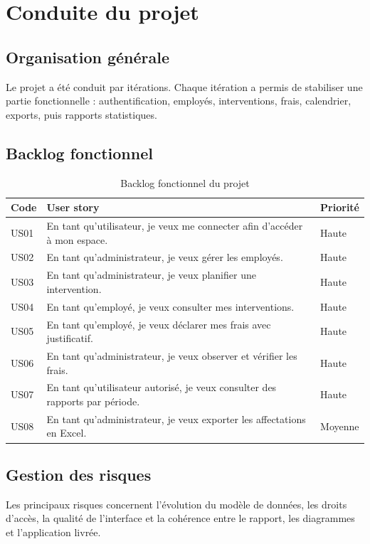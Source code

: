 \documentclass[12pt,a4paper,oneside]{report}
\begin{document}
\chapter{Conduite du projet}
\section{Organisation générale}
Le projet a été conduit par itérations. Chaque itération a permis de stabiliser une partie fonctionnelle : authentification, employés, interventions, frais, calendrier, exports, puis rapports statistiques.

\section{Backlog fonctionnel}
\begin{longtable}{p{2.5cm}p{8.5cm}p{2.5cm}}
\caption{Backlog fonctionnel du projet}\\
\toprule
\textbf{Code} & \textbf{User story} & \textbf{Priorité}\\
\midrule
US01 & En tant qu'utilisateur, je veux me connecter afin d'accéder à mon espace. & Haute\\
US02 & En tant qu'administrateur, je veux gérer les employés. & Haute\\
US03 & En tant qu'administrateur, je veux planifier une intervention. & Haute\\
US04 & En tant qu'employé, je veux consulter mes interventions. & Haute\\
US05 & En tant qu'employé, je veux déclarer mes frais avec justificatif. & Haute\\
US06 & En tant qu'administrateur, je veux observer et vérifier les frais. & Haute\\
US07 & En tant qu'utilisateur autorisé, je veux consulter des rapports par période. & Haute\\
US08 & En tant qu'administrateur, je veux exporter les affectations en Excel. & Moyenne\\
\bottomrule
\end{longtable}

\section{Gestion des risques}
Les principaux risques concernent l'évolution du modèle de données, les droits d'accès, la qualité de l'interface et la cohérence entre le rapport, les diagrammes et l'application livrée.
\end{document}
